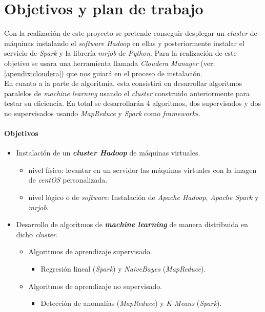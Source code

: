 
\chapter*{Objetivos y plan de trabajo}\label{objetivos_plan_trabajo}

Con la realización de este proyecto se pretende conseguir desplegar un \textit{cluster} de máquinas instalando el
\textit{software Hadoop} en ellas y posteriormente instalar el servicio de \textit{Spark} y la librería \textit{mrjob}
de \textit{Python}. Para la realización de este objetivo se usara una herramienta llamada \textit{Cloudera Manager} 
(ver: \autoref{apendix:cloudera}) que nos guiará en el proceso de instalación. \\
En cuanto a la parte de algoritmia, esta consistirá en desarrollar algoritmos paralelos de \textit{machine learning} 
usando el \textit{cluster} construido anteriormente para testar su eficiencia. En total se desarrollarán 4 algoritmos,
dos supervisados y dos no supervisados usando \textit{MapReduce} y \textit{Spark} como \textit{frameworks}.
\newline

\subsubsection*{Objetivos}
\begin{itemize}
  \item Instalación de un \textbf{\textit{cluster Hadoop}} de máquinas virtuales.
  \begin{itemize}
    \item nivel físico: levantar en un servidor las máquinas virtuales con la imagen de \textit{centOS} personalizada.
    \item nivel lógico o de \textit{software}: Instalación de \textit{Apache Hadoop}, \textit{Apache Spark} 
          y \textit{mrjob}.
  \end{itemize}
  \item Desarrollo de algoritmos de \textbf{\textit{machine learning}} de manera distribuida en dicho \textit{cluster}.
  \begin{itemize}
    \item Algoritmos de aprendizaje supervisado.
    \begin{itemize}
      \item Regresión lineal (\textit{Spark}) y \textit{NaiveBayes} (\textit{MapReduce}).
    \end{itemize}
    \item Algoritmos de aprendizaje no supervisado.
    \begin{itemize}
      \item Detección de anomalías (\textit{MapReduce}) y \textit{K-Means} (\textit{Spark}).
    \end{itemize}
  \end{itemize}
\end{itemize}

